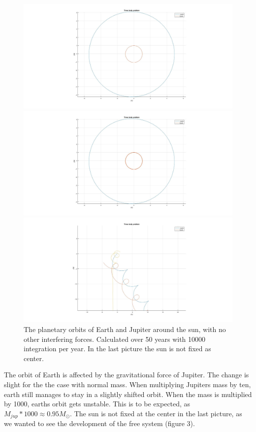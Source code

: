 \documentclass[10pt,a4paper]{article}
\begin{document}
\begin{figure} [H]  

\centerline{\includegraphics[scale=0.25]{ThreeBody3.jpg}}
\centerline{\includegraphics[scale=0.23]{ThreeBody12.jpg}}
\centerline{ \includegraphics[scale=0.23]{ThreeBody1001.jpg}}
\caption{The planetary orbits of Earth and Jupiter around the sun, with no other interfering forces. Calculated over 50 years with 10000 integration per year. In the last picture the sun is not fixed as center.}
\end{figure}
\noindent The orbit of Earth is affected by the gravitational force of Jupiter. The change is slight for the the case with normal mass. When multiplying Jupiters mass by ten, earth still manages to stay in a slightly shifted orbit. When the mass is multiplied by 1000, earths orbit gets unstable. This is to be expected, as $M_{jup}*1000\approx0.95M_{\odot}$. The sun is not fixed at the center in the last picture, as we wanted to see the development of the free system (figure 3). 
\end{document}

